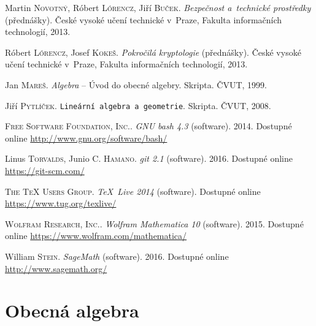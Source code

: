\documentclass[thesis=M,czech,hidelinks]{FITthesis}[2012/06/26]
\newcommand{\0}{{\textcolor[gray]{0.75}{0}}}
\begin{document}
\begin{thebibliography}{99}
        Martin \textsc{Novotný}, Róbert \textsc{Lórencz}, Jiří \textsc{Buček}.
        \emph{Bezpečnost a~technické prostředky} (přednášky).
        České vysoké učení technické v~Praze, Fakulta informačních technologií,
        2013.

        Róbert \textsc{Lórencz}, Josef \textsc{Kokeš}. \emph{Pokročilá
        kryptologie} (přednášky).
        České vysoké učení technické v~Praze, Fakulta informačních technologií,
        2013.


        Jan \textsc{Mareš}. \emph{Algebra} -- Úvod do obecné algebry. Skripta.
        ČVUT, 1999.

        Jiří \textsc{Pytlíček}. \texttt{Lineární algebra a geometrie}. Skripta.
        ČVUT, 2008.


        \textsc{Free Software Foundation, Inc.}. \emph{GNU bash 4.3}
        (software). 2014. Dostupné online \url{http://www.gnu.org/software/bash/}

        Linus \textsc{Torvalds}, Junio C. \textsc{Hamano}. \emph{git 2.1}
        (software). 2016. Dostupné online \url{https://git-scm.com/}

      \textsc{The TeX Users Group}. \emph{\TeX\ Live 2014} (software). Dostupné
      online \url{https://www.tug.org/texlive/}

        \textsc{Wolfram Research, Inc.}. \emph{Wolfram Mathematica 10}
        (software). 2015. Dostupné online
        \url{https://www.wolfram.com/mathematica/}

        William \textsc{Stein}. \emph{SageMath} (software). 2016. Dostupné
        online \url{http://www.sagemath.org/}

\end{thebibliography}





\appendix

\chapter{Obecná algebra}\label{app_algebra}
\end{document}
